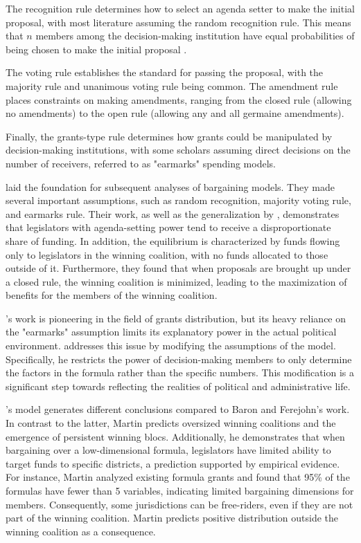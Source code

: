 The recognition rule determines how to select an agenda setter to make the initial proposal, with most literature assuming the random recognition rule. This means that $n$ members among the decision-making institution have equal probabilities of being chosen to make the initial proposal \parencite{kalandrakis2004three,anesi2015bargaining,diermeier2011legislative,rosenstiel2021congressional}.

The voting rule establishes the standard for passing the proposal, with the majority rule and unanimous voting rule being common. The amendment rule places constraints on making amendments, ranging from the closed rule (allowing no amendments) to the open rule (allowing any and all germaine amendments).

Finally, the grants-type rule determines how grants could be manipulated by decision-making institutions, with some scholars assuming direct decisions on the number of receivers, referred to as "earmarks" spending models. %

\Textcite{baron1989bargaining} laid the foundation for subsequent analyses of bargaining models. They made several important assumptions, such as random recognition, majority voting rule, and earmarks rule. Their work, as well as the generalization by \Textcite{banks2006general}, demonstrates that legislators with agenda-setting power tend to receive a disproportionate share of funding. In addition, the equilibrium is characterized by funds flowing only to legislators in the winning coalition, with no funds allocated to those outside of it. Furthermore, they found that when proposals are brought up under a closed rule, the winning coalition is minimized, leading to the maximization of benefits for the members of the winning coalition.

\Textcite{baron1989bargaining}'s work is pioneering in the field of grants distribution, but its heavy reliance on the "earmarks" assumption limits its explanatory power in the actual political environment. \Textcite{martin2018dividing} addresses this issue by modifying the assumptions of the model. Specifically, he restricts the power of decision-making members to only determine the factors in the formula rather than the specific numbers. This modification is a significant step towards reflecting the realities of political and administrative life.

\textcite{martin2018dividing}'s model generates different conclusions compared to Baron and Ferejohn's work. In contrast to the latter, Martin predicts oversized winning coalitions and the emergence of persistent winning blocs. Additionally, he demonstrates that when bargaining over a low-dimensional formula, legislators have limited ability to target funds to specific districts, a prediction supported by empirical evidence. For instance, Martin analyzed existing formula grants and found that 95\% of the formulas have fewer than 5 variables, indicating limited bargaining dimensions for members. Consequently, some jurisdictions can be free-riders, even if they are not part of the winning coalition. Martin predicts positive distribution outside the winning coalition as a consequence.


